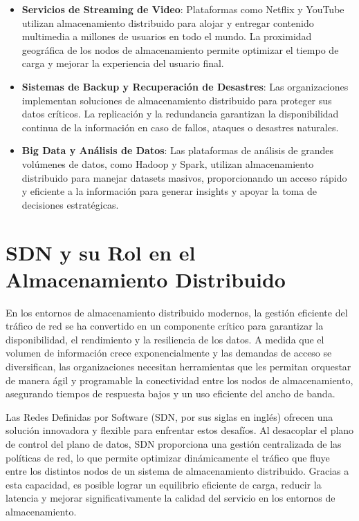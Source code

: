 {            \begin{itemize}
                \item \textbf{Servicios de Streaming de Video}: Plataformas como Netflix y YouTube utilizan almacenamiento distribuido para alojar y entregar contenido multimedia a millones de usuarios en todo el mundo. La proximidad geográfica de los nodos de almacenamiento permite optimizar el tiempo de carga y mejorar la experiencia del usuario final.
                \item \textbf{Sistemas de Backup y Recuperación de Desastres}: Las organizaciones implementan soluciones de almacenamiento distribuido para proteger sus datos críticos. La replicación y la redundancia garantizan la disponibilidad continua de la información en caso de fallos, ataques o desastres naturales.
                \item \textbf{Big Data y Análisis de Datos}: Las plataformas de análisis de grandes volúmenes de datos, como Hadoop y Spark, utilizan almacenamiento distribuido para manejar datasets masivos, proporcionando un acceso rápido y eficiente a la información para generar insights y apoyar la toma de decisiones estratégicas.
            \end{itemize}
                        
    \section{SDN y su Rol en el Almacenamiento Distribuido}
        En los entornos de almacenamiento distribuido modernos, la gestión eficiente del tráfico de red se ha convertido en un componente crítico para garantizar la disponibilidad, el rendimiento y la resiliencia de los datos. A medida que el volumen de información crece exponencialmente y las demandas de acceso se diversifican, las organizaciones necesitan herramientas que les permitan orquestar de manera ágil y programable la conectividad entre los nodos de almacenamiento, asegurando tiempos de respuesta bajos y un uso eficiente del ancho de banda.
        
        Las Redes Definidas por Software (SDN, por sus siglas en inglés) ofrecen una solución innovadora y flexible para enfrentar estos desafíos. Al desacoplar el plano de control del plano de datos, SDN proporciona una gestión centralizada de las políticas de red, lo que permite optimizar dinámicamente el tráfico que fluye entre los distintos nodos de un sistema de almacenamiento distribuido. Gracias a esta capacidad, es posible lograr un equilibrio eficiente de carga, reducir la latencia y mejorar significativamente la calidad del servicio en los entornos de almacenamiento.
        
}
